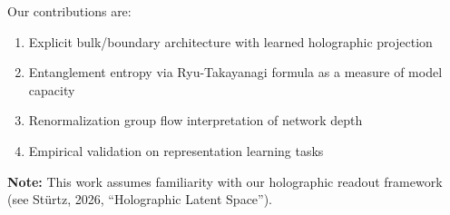 \documentclass[12pt,a4paper]{article}
\begin{document}
Our contributions are:

\begin{enumerate}[label=\textbf{\arabic*.}, leftmargin=1.5cm]
\item Explicit bulk/boundary architecture with learned holographic projection
\item Entanglement entropy via Ryu-Takayanagi formula as a measure of model capacity
\item Renormalization group flow interpretation of network depth
\item Empirical validation on representation learning tasks
\end{enumerate}

\textbf{Note:} This work assumes familiarity with our holographic readout framework (see Stürtz, 2026, ``Holographic Latent Space'').
\end{document}
